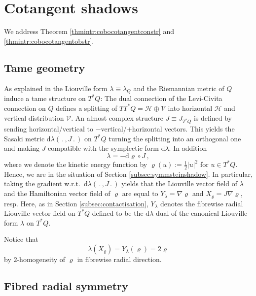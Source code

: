 \documentclass{amsart}
\theoremstyle{definition}
\newcommand{\rmd}{\mathrm d}
\newcommand{\HH}{\mathcal H}
\newcommand{\VV}{\mathcal V}
\begin{document}


\section{Cotangent shadows\label{sec:cotangshadow}}


We address Theorem
\ref{thmintr:cobocotangentconstr} and \ref{thmintr:cobocotangentobstr}.



\subsection{Tame geometry\label{subsec:tamegeom}}


As explained in \cite[Section 5]{kwz22}
the Liouville form $\lambda\equiv\lambda_Q$
and the Riemannian metric of $Q$
induce a tame structure on $T^*Q$:
The dual connection of the Levi-Civita connection on $Q$
defines a splitting of $TT^*Q=\HH\oplus\VV$
into horizontal $\HH$ and vertical distribution $\VV$.
An almost complex structure $J\equiv J_{T^*Q}$
is defined by sending horizontal/vertical
to $-$vertical/$+$horizontal vectors.
This yields the Sasaki metric
$\rmd\lambda(\,.\,,J\,.\,)$
on $T^*Q$ turning the splitting into an orthogonal one
and making $J$ compatible with the symplectic form $\rmd\lambda$.
In addition
\[
\lambda=
-\rmd\varrho\circ J\,,
\]
where we denote the kinetic energy function
by $\varrho(u):=\frac12|u|^2$ for $u\in T^*Q$.
Hence,
we are in the situation of
Section \ref{subsec:symmsteinshadow}.
In particular,
taking the gradient w.r.t.\ $\rmd\lambda(\,.\,,J\,.\,)$
yields that the Liouville vector field of $\lambda$
and the Hamiltonian vector field of $\varrho$
are equal to $Y_{\lambda}=\nabla\!\varrho$
and $X_{\varrho}=J\nabla\!\varrho$, resp.
Here, as in Section \ref{subsec:contactisation},
$Y_{\lambda}$ denotes the fibrewise radial
Liouville vector field on $T^*Q$
defined to be the $\rmd\lambda$-dual
of the canonical Liouville form $\lambda$ on $T^*Q$.

Notice that
\[
\lambda(X_{\varrho})=
Y_{\lambda}(\varrho)=
2\varrho
\]
by $2$-homogeneity of $\varrho$
in fibrewise radial direction.






\subsection{Fibred radial symmetry\label{subsec:fibwradsymm}}
\end{document}
